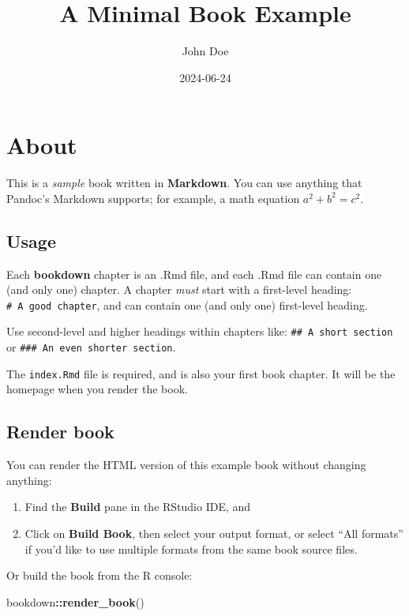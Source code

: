 \documentclass[
]{book}
\title{A Minimal Book Example}
\author{John Doe}
\date{2024-06-24}
\newenvironment{Shaded}{\begin{snugshade}}{\end{snugshade}}
\newcommand{\FunctionTok}[1]{\textcolor[rgb]{0.13,0.29,0.53}{\textbf{#1}}}
\newcommand{\NormalTok}[1]{#1}
\newcommand{\SpecialCharTok}[1]{\textcolor[rgb]{0.81,0.36,0.00}{\textbf{#1}}}
\begin{document}
\maketitle

{
\setcounter{tocdepth}{1}
\tableofcontents
}
\hypertarget{about}{%
\chapter{About}\label{about}}

This is a \emph{sample} book written in \textbf{Markdown}. You can use anything that Pandoc's Markdown supports; for example, a math equation \(a^2 + b^2 = c^2\).

\hypertarget{usage}{%
\section{Usage}\label{usage}}

Each \textbf{bookdown} chapter is an .Rmd file, and each .Rmd file can contain one (and only one) chapter. A chapter \emph{must} start with a first-level heading: \texttt{\#\ A\ good\ chapter}, and can contain one (and only one) first-level heading.

Use second-level and higher headings within chapters like: \texttt{\#\#\ A\ short\ section} or \texttt{\#\#\#\ An\ even\ shorter\ section}.

The \texttt{index.Rmd} file is required, and is also your first book chapter. It will be the homepage when you render the book.

\hypertarget{render-book}{%
\section{Render book}\label{render-book}}

You can render the HTML version of this example book without changing anything:

\begin{enumerate}
\def\labelenumi{\arabic{enumi}.}
\item
  Find the \textbf{Build} pane in the RStudio IDE, and
\item
  Click on \textbf{Build Book}, then select your output format, or select ``All formats'' if you'd like to use multiple formats from the same book source files.
\end{enumerate}

Or build the book from the R console:

\begin{Shaded}
\begin{Highlighting}[]
\NormalTok{bookdown}\SpecialCharTok{::}\FunctionTok{render\_book}\NormalTok{()}
\end{Highlighting}
\end{Shaded}
\end{document}

